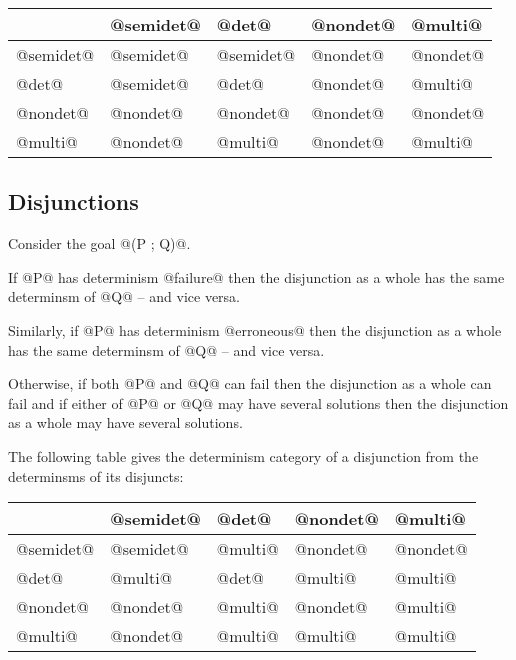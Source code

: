 \begin{center}
\begin{tabular}{l|llll}
              & @semidet@   & @det@       & @nondet@    & @multi@ \\
\hline
@semidet@     & @semidet@   & @semidet@   & @nondet@    & @nondet@ \\
@det@         & @semidet@   & @det@       & @nondet@    & @multi@ \\
@nondet@      & @nondet@    & @nondet@    & @nondet@    & @nondet@ \\
@multi@       & @nondet@    & @multi@     & @nondet@    & @multi@ \\
\end{tabular}
\end{center}

\subsection{Disjunctions}

Consider the goal @(P ; Q)@.

If @P@ has determinism @failure@ then the disjunction as a whole has
the same determinsm of @Q@ -- and vice versa.

Similarly, if @P@ has determinism @erroneous@ then the disjunction as a
whole has the same determinsm of @Q@ -- and vice versa.

Otherwise, if both @P@ and @Q@ can fail then the disjunction as a whole
can fail and if either of @P@ or @Q@ may have several solutions then the
disjunction as a whole may have several solutions.

The following table gives the determinism category of a disjunction from
the determinsms of its disjuncts:

\begin{center}
\begin{tabular}{l|llll}
            & @semidet@   & @det@       & @nondet@    & @multi@ \\
\hline
@semidet@   & @semidet@   & @multi@     & @nondet@    & @nondet@ \\
@det@       & @multi@     & @det@       & @multi@     & @multi@ \\
@nondet@    & @nondet@    & @multi@     & @nondet@    & @multi@ \\
@multi@     & @nondet@    & @multi@     & @multi@     & @multi@ \\
\end{tabular}
\end{center}

